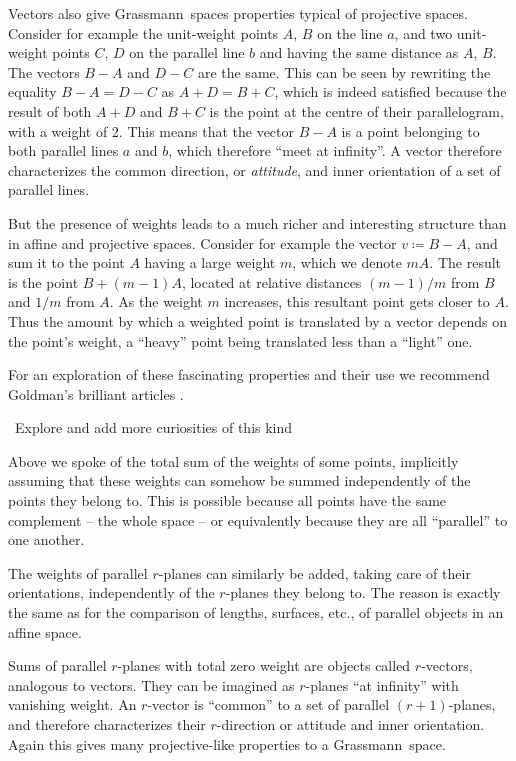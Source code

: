 \documentclass[\ifafour a4paper,12pt,\else a5paper,10pt,\fi%
onecolumn,oneside,article,%
british%
]{memoir}
\theoremstyle{remark}
\theoremstyle{innote}
\newcommand*{\defd}{\coloneqq}
\renewcommand*{\|}{\nonscript\,\vert\nonscript\;\mathopen{}}
\newcommand*{\etc}{{etc.}}
\newcommand*{\puzzle}{{\fontencoding{U}\fontfamily{fontawesometwo}\selectfont\symbol{225}}}
\newcommand{\mynote}[1]{ {\color{notecolour}\puzzle\ #1}}
\newcommand*{\gm}{Grassmann}
\newcommand*{\+}{\boxplus}
\newcommand*{\yr}{r}
\newcommand*{\ym}{m}
\newcommand*{\ya}{a}
\newcommand*{\yb}{b}
\begin{document}
Vectors also give \gm\ spaces properties typical of projective spaces.
Consider for example the unit-weight points $A$, $B$ on the line $\ya$, and
two unit-weight points $C$, $D$ on the parallel line $\yb$ and having the
same distance as $A$, $B$. The vectors $B-A$ and $D-C$ are the same. This
can be seen by rewriting the equality $B-A = D-C$ as $A+D = B+C$, which is
indeed satisfied because the result of both $A+D$ and $B+C$ is the point at
the centre of their parallelogram, with a weight of $2$. This means that
the vector $B-A$ is a point belonging to both parallel lines $\ya$ and
$\yb$, which therefore \enquote{meet at infinity}. A vector therefore
characterizes the common direction, or \emph{attitude}, and inner
orientation of a set of parallel lines.

But the presence of weights leads to a much richer and interesting
structure than in affine and projective spaces. Consider for example the
vector $v \defd B-A$, and sum it to the point $A$ having a large weight
$\ym$, which we denote $\ym A$. The result is the point $B+(\ym-1)A$,
located at relative distances $(\ym-1)/\ym$ from $B$ and $1/\ym$ from $A$.
As the weight $\ym$ increases, this resultant point gets closer to $A$.
Thus the amount by which a weighted point is translated by a vector depends
on the point's weight, a \enquote{heavy} point being translated less than a
\enquote{light} one.

For an exploration of these fascinating properties and their use we
recommend Goldman's brilliant articles \cite{goldman2000,goldman2002}.

\mynote{Explore and add more curiosities of this kind}


\medskip

Above we spoke of the total sum of the weights of some points, implicitly
assuming that these weights can somehow be summed independently of the
points they belong to. This is possible because all points have the same
complement -- the whole space -- or equivalently because they are all
\enquote{parallel} to one another.

The weights of parallel $\yr$-planes can similarly be added, taking care of
their orientations, independently of the $\yr$-planes they belong to. The
reason is exactly the same as for the comparison of lengths, surfaces,
\etc, of parallel objects in an affine space.

Sums of parallel $\yr$-planes with total zero weight are objects called
$\yr$-vectors, analogous to vectors. They can be imagined as $\yr$-planes
\enquote{at infinity} with vanishing weight. An $\yr$-vector is
\enquote{common} to a set of parallel $(\yr+1)$-planes, and therefore
characterizes their $\yr$-direction or attitude and inner orientation.
Again this gives many projective-like properties to a \gm\ space.
\end{document}
